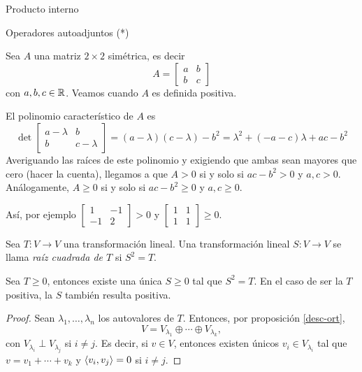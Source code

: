 \begin{chapter}{Producto interno}
\begin{section}{Operadores autoadjuntos (*)}
        
        \begin{ejemplo*} Sea $A$ una matriz $2\times 2$ simétrica,  es decir
            $$
            A = \begin{bmatrix} 
            a&b\\b&c
            \end{bmatrix}
            $$
            con $a,b,c \in \mathbb R$. Veamos cuando $A$ es definida positiva.
            
            El polinomio característico de $A$ es 
            $$
            \det \begin{bmatrix} 
            a-\lambda &b\\b&c -\lambda
            \end{bmatrix} =
            (a-\lambda)(c -\lambda) - b^2 = \lambda^2 +(-a-c)\lambda + ac - b^2
            $$
            Averiguando las raíces de este polinomio y exigiendo que ambas sean mayores que cero (hacer la cuenta), llegamos a que $A>0$ si y solo si $ac - b^2 > 0$ y $a,c >0$. Análogamente, $A\ge 0$ si y solo si $ac - b^2 \ge 0$ y $a,c \ge0$. 
            
            Así, por ejemplo $\begin{bmatrix}
            1&-1\\-1&2
            \end{bmatrix} > 0$  y  $\begin{bmatrix}
            1&1\\1&1
            \end{bmatrix} \ge 0$.	
        \end{ejemplo*}
        
        
        \begin{definicion}
            Sea $T: V \to V$ una transformación lineal. Una transformación  lineal $S: V \to V$  se llama \textit{raíz cuadrada de $T$} si $S^2 = T$.
        \end{definicion}
        
        
        
        \begin{teorema}
            Sea $T \ge 0$, entonces existe una única $S \ge 0$ tal que $S^2 = T$. En el caso de ser la $T$ positiva,  la $S$ también resulta positiva.
        \end{teorema}
        \begin{proof}
            Sean  $\lambda_1,\ldots,\lambda_n$ los autovalores de $T$. Entonces, por proposición \ref{desc-ort}, 
                $$
            V = V_{\lambda_1}\oplus \cdots \oplus V_{\lambda_k},
            $$
            con  $V_{\lambda_i} \perp V_{\lambda_j}$  si $i \ne j$. Es decir, si $v \in V$, entonces existen únicos $v_i \in V_{\lambda_i}$ tal que $v = v_1+\cdots+v_k$ y $\langle v_i,v_j \rangle = 0$ si $i \ne j$.
            

\end{proof}
\end{section}
\end{chapter}
